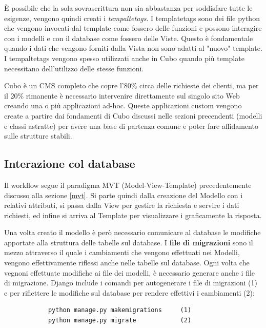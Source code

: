\documentclass[12pt,a4paper]{article}
\begin{document}
È possibile che la sola sovrascrittura non sia abbastanza per soddisfare tutte le esigenze, vengono quindi creati i \textit{tempaltetags}. I templatetags sono dei file python che vengono invocati dal template come fossero delle funzioni e possono interagire con i modelli e con il database come fossero delle Viste. Questo è fondamentale quando i dati che vengono forniti dalla Vista non sono adatti al "nuovo" template.
I tempaltetags vengono spesso utilizzati anche in Cubo quando più template necessitano dell'utilizzo delle stesse funzioni.

Cubo è un CMS completo che copre l'80\% circa delle richieste dei clienti, ma per il 20\% rimanente è necessario intervenire direttamente sul singolo sito Web creando una o più applicazioni ad-hoc. Queste applicazioni custom vengono create a partire dai fondamenti di Cubo discussi nelle sezioni precendenti (modelli e classi astratte) per avere una base di partenza comune e poter fare affidamento sulle strutture stabili.
\subsection{Interazione col database}
Il workflow segue il paradigma MVT (Model-View-Template) precedentemente discusso alla sezione \ref{mvt}. Si parte quindi dalla creazione del Modello con i relativi attributi, si passa dalla View per gestire la richiesta e servire i dati richiesti, ed infine si arriva al Template per visualizzare i graficamente la risposta.

Una volta creato il modello è però necessario comunicare al database le modifiche apportate alla struttura delle tabelle sul database.
I \textbf{file di migrazioni} sono il mezzo attraverso il quale i cambiamenti che vengono effettuati nei Modelli, vengono effettivamente riflessi anche nelle tabelle sul database.
Ogni volta che vegnoni effettuate modifiche ai file dei modelli, è necessario generare anche i file di migrazione. Django include i comandi per autogenerare i file di migrazioni (1) e per riflettere le modifiche sul database per rendere effettivi i cambiamenti (2):
\begin{verbatim}
            python manage.py makemigrations     (1)
            python manage.py migrate            (2)
\end{verbatim}
\end{document}
